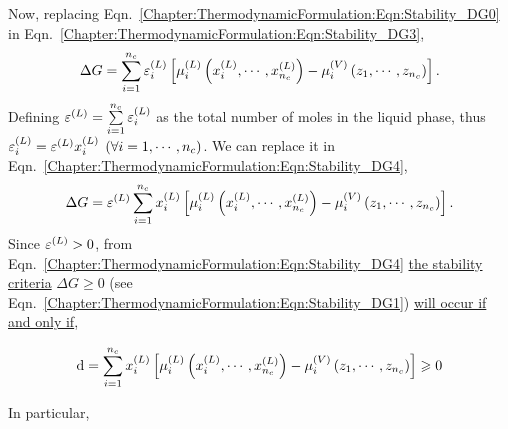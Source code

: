 Now, replacing Eqn.~\ref{Chapter:ThermodynamicFormulation:Eqn:Stability_DG0} in Eqn.~\ref{Chapter:ThermodynamicFormulation:Eqn:Stability_DG3},
\begin{equation}
    \Delta G = \summation_{i=1}^{n_{c}} \mfr[\varepsilon]{i}{L}\left[\mfr[\mu]{i}{L}\left(\mfr[x]{i}{L}, \cdots, \mfr[x]{n_{c}}{L}\right) - \mfr[\mu]{i}{V}\left(z_{1}, \cdots, z_{n_{c}}\right)\right].\label{Chapter:ThermodynamicFormulation:Eqn:Stability_DG4}
\end{equation}
Defining $\mfr[\varepsilon]{}{L} = \summation_{i=1}^{n_{c}}\mfr[\varepsilon]{i}{L}$ as the total number of moles in the liquid phase, thus $\mfr[\varepsilon]{i}{L} = \mfr[\varepsilon]{}{L} \mfr[x]{i}{L}\;\left(\forall i=1, \cdots, n_{c}\right)$. We can replace it in Eqn.~\ref{Chapter:ThermodynamicFormulation:Eqn:Stability_DG4},
\begin{equation}
   \Delta G = \mfr[\varepsilon]{}{L} \summation_{i=1}^{n_{c}}\mfr[x]{i}{L} \left[\mfr[\mu]{i}{L}\left(\mfr[x]{i}{L}, \cdots, \mfr[x]{n_{c}}{L}\right) - \mfr[\mu]{i}{V}\left(z_{1}, \cdots, z_{n_{c}}\right)\right].\label{Chapter:ThermodynamicFormulation:Eqn:Stability_DG4}
\end{equation}
Since $\mfr[\varepsilon]{}{L}>0$, from Eqn.~\ref{Chapter:ThermodynamicFormulation:Eqn:Stability_DG4} \underline{the stability criteria} $\Delta G \ge 0$ (see Eqn.~\ref{Chapter:ThermodynamicFormulation:Eqn:Stability_DG1}) \underline{ will occur if and only if},
\begin{shaded}
  \begin{equation}
     \d = \summation_{i=1}^{n_{c}}\mfr[x]{i}{L} \left[\mfr[\mu]{i}{L}\left(\mfr[x]{i}{L}, \cdots, \mfr[x]{n_{c}}{L}\right) - \mfr[\mu]{i}{V}\left(z_{1}, \cdots, z_{n_{c}}\right)\right] \ge 0 \label{Chapter:ThermodynamicFormulation:Eqn:Stability_Main}
  \end{equation}
\end{shaded}
In particular,

\citet{michelsen_1984} 
\citep[see also][]{michelsen_2007}

